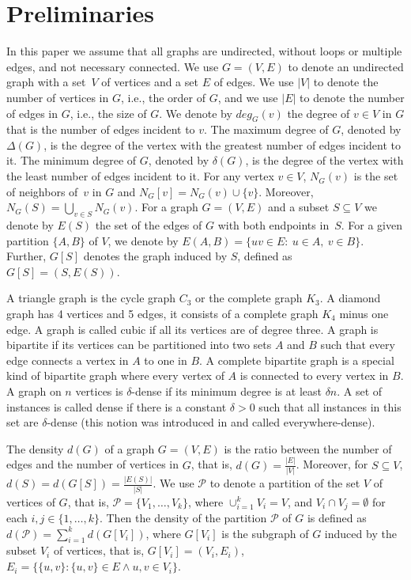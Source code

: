 \documentclass[a4paper,USenglish,cleveref, autoref]{lipics-v2021}
\begin{document}
\section{Preliminaries}\label{sec2}
 In this paper we assume that all graphs are undirected, without loops or  multiple edges, and not necessary connected. We use $G=(V,E)$ to denote an undirected  graph with a set~$V$ of vertices and a set $E$ of edges.  We use $|V|$ to denote the number of vertices in $G$, i.e., the order of $G$, and we use $|E|$ to denote the number of edges in $G$, i.e., the size of $G$. We denote by $deg_G(v)$ the degree of $v\in V$ in $G$ that is the number of edges incident to $v$. 
The maximum degree of $G$, denoted by $\Delta(G)$, is the degree of the vertex with the greatest number of edges incident to it. The minimum degree of $G$, denoted by $\delta(G)$, is the degree of the vertex with the least number of edges incident to it. For any vertex $v\in V$, $N_G(v)$ is the set of neighbors of~$v$ in $G$ and $N_G[v]= N_G(v)\cup\{v\}$.  Moreover, $N_G(S)=\bigcup_{v \in S} N_G(v)$. For a  graph $G=(V,E)$  and a subset $S\subseteq V$ we denote by $E(S)$ the set of the edges of $G$ with both endpoints in~$S$. For a given  partition $\{A,B\}$  of $V$, we  denote  by $E(A,B) = \{uv \in E:~u \in A,~ v \in B\}$. Further, $G[S]$ denotes the graph induced by $S$, defined as $G[S]=(S, E(S))$.
   
 A triangle graph is  the cycle graph $C_{3}$ or  the complete graph  $K_{3}$. %
 A diamond graph has 4 vertices and 5 edges, it consists of a complete graph $K_{4}$ minus one edge. A graph is called cubic  if all its vertices are of degree three. A  graph is bipartite if its vertices can be partitioned into two sets $A$ and $B$ such that every edge connects a vertex in $A$ to one in $B$. A complete bipartite graph  is a special kind of bipartite graph where every vertex of $A$ is connected to every vertex in $B$. A graph  on $n$ vertices is $\delta$-dense if its minimum degree is at least $\delta n$. A set of instances is called  dense if there is a constant $\delta >0$ such that all instances in this set are $\delta$-dense (this notion was introduced in \cite{AroraKK95} and called everywhere-dense).  

The density $d(G)$ of a graph $G=(V,E)$ is the ratio between the number of edges and the number of vertices in $G$, that is, $d(G)=\tfrac{|E|}{|V|}$. Moreover, for $S\subseteq V$, $d(S)=d(G[S])=\tfrac{|E(S)|}{|S|}$. We use $\mathcal{P}$ to denote a partition of the set $V$
 of vertices of $G$, that is,  $\mathcal{P} = \{ V_1, \dots, V_k\}$, where $\cup_{i=1}^k V_i = V$, and $V_i \cap V_j = \emptyset$ for each $i, j \in \{1, \dots, k\}$. Then the density of the partition $\mathcal{P}$ of $G$ is defined as  $d(\mathcal{P})=\sum_{i=1}^k d(G[V_i])$, where $G[V_i]$ is the subgraph of $G$ induced by the subset $V_i$ of vertices, that is, $G[V_i]= (V_i, E_i)$, $E_i = \{\{u,v\} : \{u,v\} \in E \land u,v\in V_i\}$.  
 
\end{document}
